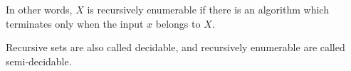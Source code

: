 

\setcounter{section}{3}
\setcounter{subsection}{4}
\setcounter{dfn}{27}

In other words, $X$ is recursively enumerable if there is an algorithm which terminates only when the input $x$ belongs to $X$.

Recursive sets are also called decidable, and recursively enumerable are called semi-decidable.



